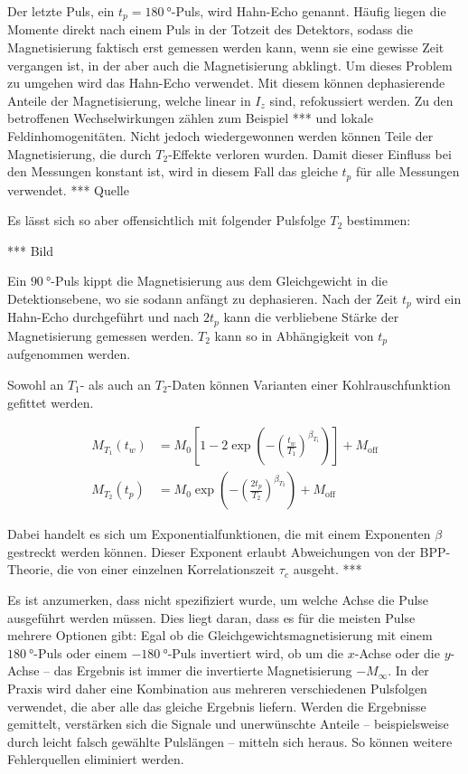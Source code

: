 Der letzte Puls, ein $t_p = \SI{180}{\degree}$-Puls, wird Hahn-Echo genannt. Häufig liegen die Momente direkt nach einem Puls in der Totzeit des Detektors, sodass die Magnetisierung faktisch erst gemessen werden kann, wenn sie eine gewisse Zeit vergangen ist, in der aber auch die Magnetisierung abklingt. Um dieses Problem zu umgehen wird das Hahn-Echo verwendet. Mit diesem können dephasierende Anteile der Magnetisierung, welche linear in $I_z$ sind, refokussiert werden. Zu den betroffenen Wechselwirkungen zählen zum Beispiel *** und lokale Feldinhomogenitäten. Nicht jedoch wiedergewonnen werden können Teile der Magnetisierung, die durch $T_2$-Effekte verloren wurden. Damit dieser Einfluss bei den Messungen konstant ist, wird in diesem Fall das gleiche $t_p$ für alle Messungen verwendet. *** Quelle

Es lässt sich so aber offensichtlich mit folgender Pulsfolge $T_2$ bestimmen:

*** Bild

Ein $\SI{90}{\degree}$-Puls kippt die Magnetisierung aus dem Gleichgewicht in die Detektionsebene, wo sie sodann anfängt zu dephasieren. Nach der Zeit $t_p$ wird ein Hahn-Echo durchgeführt und nach $2 t_p$ kann die verbliebene Stärke der Magnetisierung gemessen werden. $T_2$ kann so in Abhängigkeit von $t_p$ aufgenommen werden.

Sowohl an $T_1$- als auch an $T_2$-Daten können Varianten einer Kohlrauschfunktion gefittet werden.

\begin{align}
	M_{T_1} (t_w) &= M_0 \left[ 1 - 2 \exp{ \left(- { \left( \frac{t_w}{T_1} \right) }^{\beta_{T_1}} \right)} \right] + M_\text{off} \label{eqn:theo:T_1_fit} \\
    M_{T_2} (t_p) &= M_0 \exp{ \left(- { \left( \frac{2 t_p}{T_2} \right) }^{\beta_{T_2}} \right)} + M_\text{off} \label{eqn:theo:T_2_fit}
\end{align}

Dabei handelt es sich um Exponentialfunktionen, die mit einem Exponenten $\beta$ gestreckt werden können. Dieser Exponent erlaubt Abweichungen von der BPP-Theorie, die von einer einzelnen Korrelationszeit $\tau_c$ ausgeht. ***

Es ist anzumerken, dass nicht spezifiziert wurde, um welche Achse die Pulse ausgeführt werden müssen. Dies liegt daran, dass es für die meisten Pulse mehrere Optionen gibt: Egal ob die Gleichgewichtsmagnetisierung mit einem $\SI{180}{\degree}$-Puls oder einem $\SI{-180}{\degree}$-Puls invertiert wird, ob um die $x$-Achse oder die $y$-Achse -- das Ergebnis ist immer die invertierte Magnetisierung $-M_\infty$. In der Praxis wird daher eine Kombination aus mehreren verschiedenen Pulsfolgen verwendet, die aber alle das gleiche Ergebnis liefern. Werden die Ergebnisse gemittelt, verstärken sich die Signale und unerwünschte Anteile -- beispielsweise durch leicht falsch gewählte Pulslängen -- mitteln sich heraus. So können weitere Fehlerquellen eliminiert werden.
